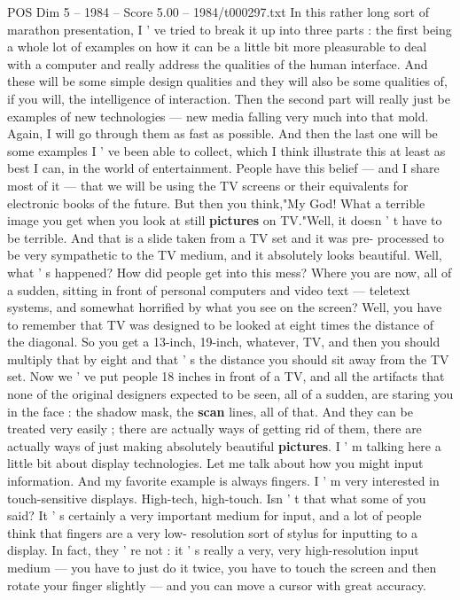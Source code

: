 \begin{textsample}{POS Dim 5 – 1984 – Score 5.00 – 1984/t000297.txt}  \label{ex:f5_pos_005}
In this rather long sort of marathon presentation, I ' ve tried to break it up into three parts : the first being a whole lot of examples on how it can be a little bit more pleasurable to deal with a computer and really address the qualities of the human interface.
And these will be some simple design qualities and they will also be some qualities of, if you will, the intelligence of interaction.
Then the second part will really just be examples of new technologies — new media falling very much into that mold.
Again, I will go through them as fast as possible.
And then the last one will be some examples I ' ve been able to collect, which I think illustrate this at least as best I can, in the world of entertainment.
People have this belief — and I share most of it — that we will be using the TV screens or their equivalents for electronic books of the future.
But then you think,"My God!
What a terrible image you get when you look at still \textbf{pictures} on TV."Well, it doesn ' t have to be terrible.
And that is a slide taken from a TV set and it was pre- processed to be very sympathetic to the TV medium, and it absolutely looks beautiful.
Well, what ' s happened?
How did people get into this mess?
Where you are now, all of a sudden, sitting in front of personal computers and video text — teletext systems, and somewhat horrified by what you see on the screen?
Well, you have to remember that TV was designed to be looked at eight times the distance of the diagonal.
So you get a 13-inch, 19-inch, whatever, TV, and then you should multiply that by eight and that ' s the distance you should sit away from the TV set.
Now we ' ve put people 18 inches in front of a TV, and all the artifacts that none of the original designers expected to be seen, all of a sudden, are staring you in the face : the shadow mask, the \textbf{scan} lines, all of that.
And they can be treated very easily ; there are actually ways of getting rid of them, there are actually ways of just making absolutely beautiful \textbf{pictures}.
I ' m talking here a little bit about display technologies.
Let me talk about how you might input information.
And my favorite example is always fingers.
I ' m very interested in touch-sensitive displays.
High-tech, high-touch.
Isn ' t that what some of you said?
It ' s certainly a very important medium for input, and a lot of people think that fingers are a very low- resolution sort of stylus for inputting to a display.
In fact, they ' re not : it ' s really a very, very high-resolution input medium — you have to just do it twice, you have to touch the screen and then rotate your finger slightly — and you can move a cursor with great accuracy.

\end{textsample}
